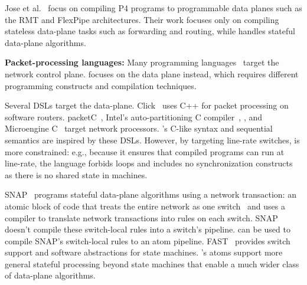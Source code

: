 Jose et al.~\cite{lavanya_compiler} focus on compiling P4 programs to
programmable data planes such as the RMT and FlexPipe architectures. Their work
focuses only on compiling stateless data-plane tasks such as forwarding and
routing, while \pktlanguage handles stateful data-plane algorithms.

\textbf{Packet-processing languages:}
Many programming languages~\cite{frenetic, maple} target the network control plane.
\pktlanguage focuses on the data plane instead, which requires different
programming constructs and compilation techniques.

Several DSLs target the data-plane. Click~\cite{click} uses C++ for packet
processing on software routers. packetC~\cite{packetc}, Intel's
auto-partitioning C compiler~\cite{intel_uiuc_pldi}, , and Microengine
C~\cite{microenginec} target network processors. \pktlanguage's C-like syntax
and sequential semantics are inspired by these DSLs. However, by targeting
line-rate switches, \pktlanguage is more constrained: e.g., because it ensures
that compiled programs can run at line-rate, the language forbids loops and
includes no synchronization constructs as there is no shared state in
\absmachine machines.

SNAP~\cite{snap} programs stateful data-plane algorithms using a network
transaction: an atomic block of code that treats the entire network as one
switch~\cite{onebigswitch} and uses a compiler to translate network
transactions into rules on each switch. SNAP doesn't compile these switch-local
rules into a switch's pipeline. \pktlanguage can be used to compile SNAP's
switch-local rules to an atom pipeline. FAST~\cite{fast} provides switch
support and software abstractions for state machines. \absmachine's atoms
support more general stateful processing beyond state machines that enable a
much wider class of data-plane algorithms.
